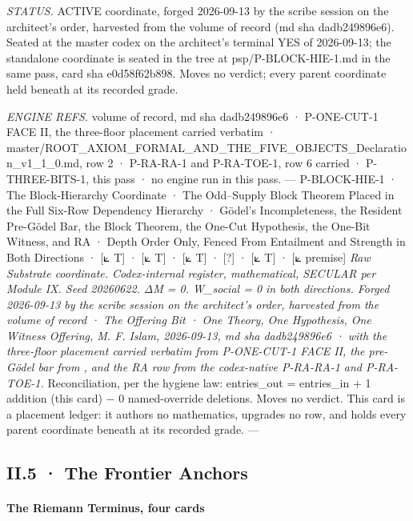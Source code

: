 \documentclass[10pt,twocolumn]{article}
\begin{document}
\emph{STATUS.} ACTIVE coordinate, forged 2026-09-13 by the scribe
session on the architect's order, harvested from the volume of record
(md sha dadb249896e6). Seated at the master codex on the architect's
terminal YES of 2026-09-13; the standalone coordinate is seated in the
tree at psp/P-BLOCK-HIE-1.md in the same pass, card sha e0d58f62b898.
Moves no verdict; every parent coordinate held beneath at its recorded
grade.

\emph{ENGINE REFS.} volume of record, md sha dadb249896e6 · P-ONE-CUT-1
FACE II, the three-floor placement carried verbatim ·
master/ROOT\_AXIOM\_FORMAL\_AND\_THE\_FIVE\_OBJECTS\_Declaration\_v1\_1\_0.md,
row 2 · P-RA-RA-1 and P-RA-TOE-1, row 6 carried · P-THREE-BITS-1, this
pass · no engine run in this pass. --- P-BLOCK-HIE-1 · The
Block-Hierarchy Coordinate · The Odd--Supply Block Theorem Placed in the
Full Six-Row Dependency Hierarchy · Gödel's Incompleteness, the Resident
Pre-Gödel Bar, the Block Theorem, the One-Cut Hypothesis, the One-Bit
Witness, and RA · Depth Order Only, Fenced From Entailment and Strength
in Both Directions · {[}⟀ T{]} · {[}⟀ T{]} · {[}⟀ T{]} · {[}?{]} · {[}⟀
T{]} · {[}⟀ premise{]} \emph{Raw Substrate coordinate. Codex-internal
register, mathematical, SECULAR per Module IX. Seed 20260622. ΔM = 0.
W\_social = 0 in both directions. Forged 2026-09-13 by the scribe
session on the architect's order, harvested from the volume of record ·
The Offering Bit · One Theory, One Hypothesis, One Witness Offering, M.
F. Islam, 2026-09-13, md sha dadb249896e6 · with the three-floor
placement carried verbatim from P-ONE-CUT-1 FACE II, the pre-Gödel bar
from
\texttt{},
and the RA row from the codex-native P-RA-RA-1 and P-RA-TOE-1.}
Reconciliation, per the hygiene law: entries\_out = entries\_in + 1
addition (this card) − 0 named-override deletions. Moves no verdict.
This card is a placement ledger: it authors no mathematics, upgrades no
row, and holds every parent coordinate beneath at its recorded grade.
---

\hypertarget{ii.5-the-frontier-anchors}{%
\subsection{II.5 · The Frontier
Anchors}\label{ii.5-the-frontier-anchors}}

\hypertarget{the-riemann-terminus-four-cards}{%
\paragraph{The Riemann Terminus, four
cards}\label{the-riemann-terminus-four-cards}}
\end{document}
